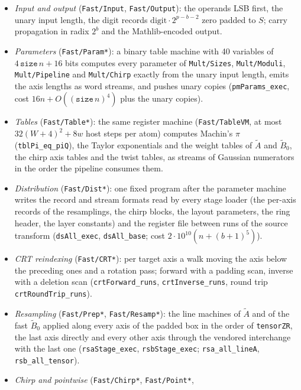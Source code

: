 \documentclass[11pt]{amsart}
\theoremstyle{remark}
\begin{document}
\begin{itemize}
\item \emph{Input and output} (\texttt{Fast/Input}, \texttt{Fast/Output}): the operands LSB
first, the unary input length, the digit records $\mathrm{digit}\cdot 2^{p-b-2}$ zero padded
to $S$; carry propagation in radix $2^b$ and the Mathlib-encoded output.
\item \emph{Parameters} (\texttt{Fast/Param*}): a binary table machine with 40 variables of
$4\,\texttt{size}\,n+16$ bits computes every parameter of \texttt{Mult/Sizes},
\texttt{Mult/Moduli}, \texttt{Mult/Pipeline} and \texttt{Mult/Chirp} exactly from the unary
input length, emits the axis lengths as word streams, and pushes unary copies
(\texttt{pmParams\_exec}, cost $16n+O((\texttt{size}\,n)^4)$ plus the unary copies).
\item \emph{Tables} (\texttt{Fast/Table*}): the same register machine
(\texttt{Fast/TableVM}, at most $32(W+4)^2+8w$ host steps per atom) computes Machin's $\pi$
(\texttt{tblPi\_eq\_piQ}), the Taylor exponentials and the weight tables of $\widetilde A$ and
$\widetilde B_0$, the chirp axis tables and the twist tables, as streams of Gaussian numerators
in the order the pipeline consumes them.
\item \emph{Distribution} (\texttt{Fast/Dist*}): one fixed program after the parameter machine
writes the record and stream formats read by every stage loader (the per-axis records of the
resamplings, the chirp blocks, the layout parameters, the ring header, the layer constants)
and the register file between runs of the source transform
(\texttt{dsAll\_exec}, \texttt{dsAll\_base}; cost $2\cdot10^{10}(n+(b+1)^5)$).
\item \emph{CRT reindexing} (\texttt{Fast/CRT*}): per target axis a walk moving the axis below
the preceding ones and a rotation pass; forward with a padding scan, inverse with a deletion
scan (\texttt{crtForward\_runs}, \texttt{crtInverse\_runs}, round trip
\texttt{crtRoundTrip\_runs}).
\item \emph{Resampling} (\texttt{Fast/Prep*}, \texttt{Fast/Resamp*}): the line machines of
$\widetilde A$ and of the fast $\widetilde B_0$ applied along every axis of the padded box in
the order of \texttt{tensorZR}, the last axis directly and every other axis through the
vendored interchange with the last one (\texttt{rsaStage\_exec}, \texttt{rsbStage\_exec};
\texttt{rsa\_all\_lineA}, \texttt{rsb\_all\_tensor}).
\item \emph{Chirp and pointwise} (\texttt{Fast/Chirp*}, \texttt{Fast/Point*},

\end{itemize}
\end{document}
